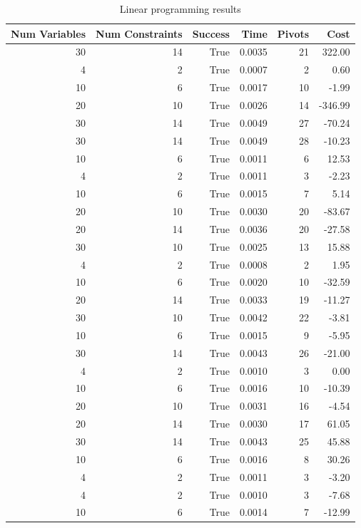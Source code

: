 \begin{table}[ht]
    \centering
    \begin{tabular}{rrrrrr}
        \toprule
        Num Variables & Num Constraints & Success & Time & Pivots & Cost \\
        \midrule
        30 & 14 & True & 0.0035 & 21 & 322.00 \\
		4 & 2 & True & 0.0007 & 2 & 0.60 \\
		10 & 6 & True & 0.0017 & 10 & -1.99 \\
		20 & 10 & True & 0.0026 & 14 & -346.99 \\
		30 & 14 & True & 0.0049 & 27 & -70.24 \\
		30 & 14 & True & 0.0049 & 28 & -10.23 \\
		10 & 6 & True & 0.0011 & 6 & 12.53 \\
		4 & 2 & True & 0.0011 & 3 & -2.23 \\
		10 & 6 & True & 0.0015 & 7 & 5.14 \\
		20 & 10 & True & 0.0030 & 20 & -83.67 \\
		20 & 14 & True & 0.0036 & 20 & -27.58 \\
		30 & 10 & True & 0.0025 & 13 & 15.88 \\
		4 & 2 & True & 0.0008 & 2 & 1.95 \\
		10 & 6 & True & 0.0020 & 10 & -32.59 \\
		20 & 14 & True & 0.0033 & 19 & -11.27 \\
		30 & 10 & True & 0.0042 & 22 & -3.81 \\
		10 & 6 & True & 0.0015 & 9 & -5.95 \\
		30 & 14 & True & 0.0043 & 26 & -21.00 \\
		4 & 2 & True & 0.0010 & 3 & 0.00 \\
		10 & 6 & True & 0.0016 & 10 & -10.39 \\
		20 & 10 & True & 0.0031 & 16 & -4.54 \\
		20 & 14 & True & 0.0030 & 17 & 61.05 \\
		30 & 14 & True & 0.0043 & 25 & 45.88 \\
		10 & 6 & True & 0.0016 & 8 & 30.26 \\
		4 & 2 & True & 0.0011 & 3 & -3.20 \\
		4 & 2 & True & 0.0010 & 3 & -7.68 \\
		10 & 6 & True & 0.0014 & 7 & -12.99 \\
        \bottomrule
    \end{tabular}
    \caption{Linear programming results}
    \label{tab:lp-results}
\end{table}
